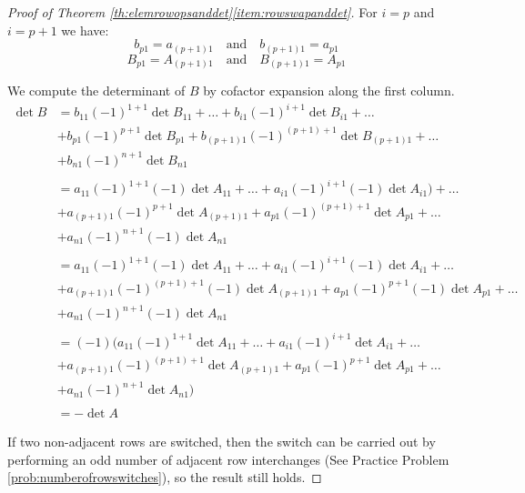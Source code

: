 \documentclass{ximera}
\begin{document}
\begin{proof}[Proof of Theorem \ref{th:elemrowopsanddet}\ref{item:rowswapanddet}]
 For $i=p$ and $i=p+1$ we have:
 $$b_{p1}=a_{(p+1)1}\quad\text{and}\quad b_{(p+1)1}=a_{p1}$$
 $$B_{p1}=A_{(p+1)1}\quad\text{and}\quad B_{(p+1)1}=A_{p1}$$
 
 We compute the determinant of $B$ by cofactor expansion along the first column.
 \begin{align*}
 \det{B}&=b_{11}(-1)^{1+1}\det{B_{11}}+\ldots +b_{i1}(-1)^{i+1}\det{B_{i1}}+\ldots\\
 &+b_{p1}(-1)^{p+1}\det{B_{p1}}+b_{(p+1)1}(-1)^{(p+1)+1}\det{B_{(p+1)1}}+\ldots\\
 &+b_{n1}(-1)^{n+1}\det{B_{n1}}\\
 \\
 &=a_{11}(-1)^{1+1}(-1)\det{A_{11}}+\ldots +a_{i1}(-1)^{i+1}(-1)\det{A}_{i1})+\ldots\\
 &+a_{(p+1)1}(-1)^{p+1}\det{A_{(p+1)1}}+a_{p1}(-1)^{(p+1)+1}\det{A_{p1}}+\ldots\\
 &+a_{n1}(-1)^{n+1}(-1)\det{A_{n1}}\\
 \\
 &=a_{11}(-1)^{1+1}(-1)\det{A_{11}}+\ldots +a_{i1}(-1)^{i+1}(-1)\det{A_{i1}}+\ldots\\
 &+a_{(p+1)1}(-1)^{(p+1)+1}(-1)\det{A_{(p+1)1}}+a_{p1}(-1)^{p+1}(-1)\det{A_{p1}}+\ldots\\
 &+a_{n1}(-1)^{n+1}(-1)\det{A_{n1}}\\
 \\
 &=(-1)\Big(a_{11}(-1)^{1+1}\det{A_{11}}+\ldots +a_{i1}(-1)^{i+1}\det{A_{i1}}+\ldots\\
 &+a_{(p+1)1}(-1)^{(p+1)+1}\det{A_{(p+1)1}}+a_{p1}(-1)^{p+1}\det{A_{p1}}+\ldots\\
 &+a_{n1}(-1)^{n+1}\det{A_{n1}}\Big)\\
 \\
 &=-\det{A}
 \end{align*}
 
 If two non-adjacent rows are switched, then the switch can be carried out by performing an odd number of adjacent row interchanges (See Practice Problem \ref{prob:numberofrowswitches}), so the result still holds.
\end{proof}
\end{document}
